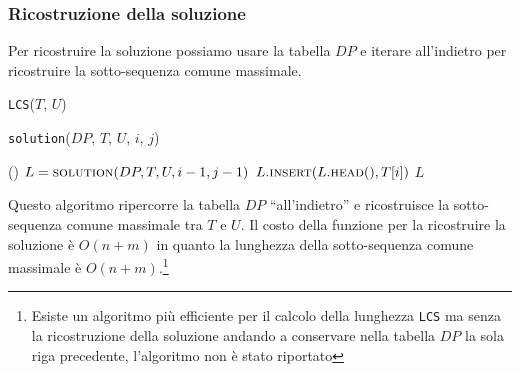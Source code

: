         \subsubsection{Ricostruzione della soluzione}
            Per ricostruire la soluzione possiamo usare la tabella $DP$ e iterare all'indietro per ricostruire la sotto-sequenza comune massimale.
            \begin{algorithm}[H]
                \caption{\Int \texttt{LCS}(\Item[] $T$, \Item[] $U$)}
                \begin{algorithmic}
                    \State [...] 
                    \State \Return {}
                \end{algorithmic}
            \end{algorithm}
            \begin{algorithm}[H]
                \caption{\List \texttt{solution}(\Int[][] $DP$, \Item[] $T$, \Item[] $U$, \Int $i$, \Int $j$)}
                \begin{algorithmic}
                        \State \Return \List()
                    \EndIf
                        \State \List $L = \Call{solution}{DP, T, U, i-1, j-1}$
                        \State $L.\Call{insert}{L.\textsc{head}(), T[i]}$
                        \State \Return $L$
                    \Else
                            \State \Return {}
                        \Else
                            \State \Return {}
                        \EndIf
                    \EndIf
                \end{algorithmic}
            \end{algorithm}
            Questo algoritmo ripercorre la tabella $DP$ ``all'indietro'' e ricostruisce la sotto-sequenza comune massimale tra $T$ e $U$.\newline
            Il costo della funzione per la ricostruire la soluzione è $O(n+m)$ in quanto la lunghezza della sotto-sequenza comune massimale è $O(n+m)$.\footnote{Esiste un algoritmo più efficiente per il calcolo della lunghezza \texttt{LCS} ma senza la ricostruzione della soluzione andando a conservare nella tabella $DP$ la sola riga precedente, l'algoritmo non è stato riportato}
